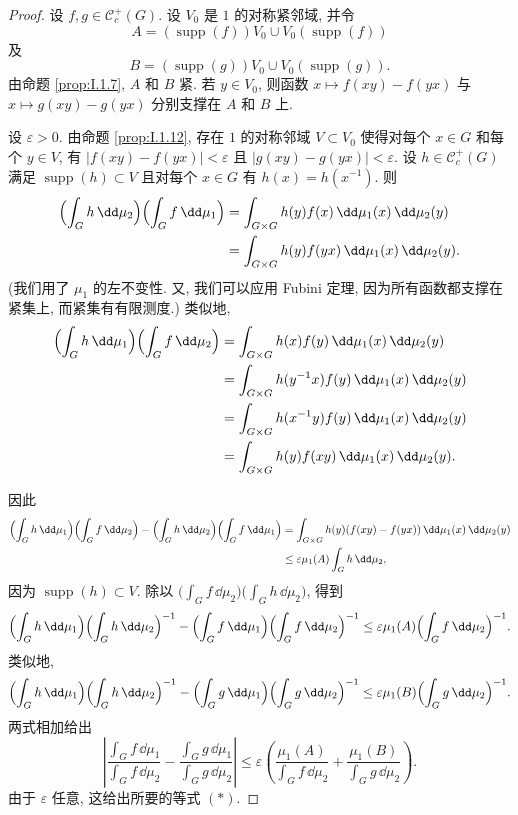 \begin{proof}
设 $f, g \in \mathcal{C}_c^+(G)$. 设 $V_0$ 是 $1$ 的对称紧邻域, 并令
\[
A = (\operatorname{supp}(f))V_0 \cup V_0(\operatorname{supp}(f))
\]
及
\[
B = (\operatorname{supp}(g))V_0 \cup V_0(\operatorname{supp}(g)).
\]
由命题 \ref{prop:I.1.7}, $A$ 和 $B$ 紧. 若 $y \in V_0$, 则函数 $x \longmapsto f(xy) - f(yx)$ 与 $x \longmapsto g(xy) - g(yx)$ 分别支撑在 $A$ 和 $B$ 上.

设 $\varepsilon > 0$. 由命题 \ref{prop:I.1.12}, 存在 $1$ 的对称邻域 $V \subset V_0$ 使得对每个 $x \in G$ 和每个 $y \in V$, 有 $|f(xy) - f(yx)| < \varepsilon$ 且 $|g(xy) - g(yx)| < \varepsilon$. 设 $h \in \mathcal{C}_c^+(G)$ 满足 $\operatorname{supp}(h) \subset V$ 且对每个 $x \in G$ 有 $h(x) = h(x^{-1})$. 则
\begin{align*}
\Bigl(\int_G h \,\dd\mu_2\Bigr)\Bigl(\int_G f \,\dd\mu_1\Bigr) &= \int_{G \times G} h(y)f(x) \,\dd\mu_1(x)\,\dd\mu_2(y) \\
&= \int_{G \times G} h(y)f(yx) \,\dd\mu_1(x)\,\dd\mu_2(y).
\end{align*}
(我们用了 $\mu_1$ 的左不变性. 又, 我们可以应用 Fubini 定理, 因为所有函数都支撑在紧集上, 而紧集有有限测度.) 类似地,
\begin{align*}
\Bigl(\int_G h \,\dd\mu_1\Bigr)\Bigl(\int_G f \,\dd\mu_2\Bigr) &= \int_{G \times G} h(x)f(y) \,\dd\mu_1(x)\,\dd\mu_2(y) \\
&= \int_{G \times G} h(y^{-1}x)f(y) \,\dd\mu_1(x)\,\dd\mu_2(y) \\
&= \int_{G \times G} h(x^{-1}y)f(y) \,\dd\mu_1(x)\,\dd\mu_2(y) \\
&= \int_{G \times G} h(y)f(xy) \,\dd\mu_1(x)\,\dd\mu_2(y).
\end{align*}

因此
\begin{align*}
\Bigl(\int_G h \,\dd\mu_1\Bigr)\Bigl(\int_G f \,\dd\mu_2\Bigr) - \Bigl(\int_G h \,\dd\mu_2\Bigr)\Bigl(\int_G f \,\dd\mu_1\Bigr) &= \int_{G \times G} h(y)(f(xy) - f(yx)) \,\dd\mu_1(x)\,\dd\mu_2(y) \\
&\leq \varepsilon\mu_1(A)\int_G h \,\dd\mu_2,
\end{align*}
因为 $\operatorname{supp}(h) \subset V$. 除以 $\bigl(\int_G f \,\dd\mu_2\bigr)\bigl(\int_G h \,\dd\mu_2\bigr)$, 得到
\[
\Bigl(\int_G h \,\dd\mu_1\Bigr)\Bigl(\int_G h \,\dd\mu_2\Bigr)^{-1} - \Bigl(\int_G f \,\dd\mu_1\Bigr)\Bigl(\int_G f \,\dd\mu_2\Bigr)^{-1} \leq \varepsilon\mu_1(A)\Bigl(\int_G f \,\dd\mu_2\Bigr)^{-1}.
\]
类似地,
\[
\Bigl(\int_G h \,\dd\mu_1\Bigr)\Bigl(\int_G h \,\dd\mu_2\Bigr)^{-1} - \Bigl(\int_G g \,\dd\mu_1\Bigr)\Bigl(\int_G g \,\dd\mu_2\Bigr)^{-1} \leq \varepsilon\mu_1(B)\Bigl(\int_G g \,\dd\mu_2\Bigr)^{-1}.
\]
两式相加给出
\[
\left|\frac{\int_G f \,\dd\mu_1}{\int_G f \,\dd\mu_2} - \frac{\int_G g \,\dd\mu_1}{\int_G g \,\dd\mu_2}\right| \leq \varepsilon\left(\frac{\mu_1(A)}{\int_G f \,\dd\mu_2} + \frac{\mu_1(B)}{\int_G g \,\dd\mu_2}\right).
\]
由于 $\varepsilon$ 任意, 这给出所要的等式 $(*)$.
\end{proof}

